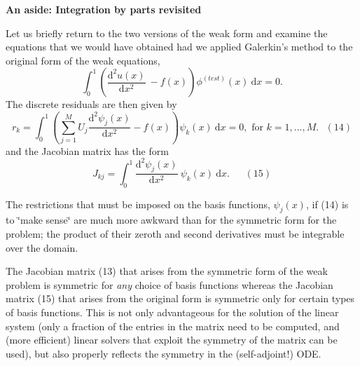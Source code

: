 \begin{TabularC}{1}
\hline
\begin{center}{\bfseries  An aside\-: Integration by parts revisited }\end{center}  Let us briefly return to the two versions of the weak form and examine the equations that we would have obtained had we applied Galerkin's method to the original form of the weak equations, \[ \int_0^1 \left( \frac{\mbox{d}^2 u(x)}{\mbox{d}x^2} \ - f(x) \right) \phi^{(test)}(x) \ \mbox{d}x = 0. \] The discrete residuals are then given by \[ r_k = \int_0^1 \left( \sum_{j=1}^{M} U_{j} \frac{\mbox{d}^2 \psi_j(x)}{\mbox{d} x^2} - f(x) \right) \psi_k(x) \ \mbox{d}x = 0, \mbox{\ \ \ \ \ \ for $k=1,...,M.$\ \ \ \ \ \ } (14) \] and the Jacobian matrix has the form \[ J_{kj} = \int_0^1\frac{\mbox{d}^2 \psi_j(x)}{\mbox{d} x^2} \ \psi_k(x)\ \mbox{d}x. \ \ \ \ \ \ \ (15) \]
\begin{DoxyItemize}
\item The restrictions that must be imposed on the basis functions, $ \psi_j(x) $, if (14) is to \char`\"{}make sense\char`\"{} are much more awkward than for the symmetric form for the problem; the product of their zeroth and second derivatives must be integrable over the domain.
\item The Jacobian matrix (13) that arises from the symmetric form of the weak problem is symmetric for {\itshape any} choice of basis functions whereas the Jacobian matrix (15) that arises from the original form is symmetric only for certain types of basis functions. This is not only advantageous for the solution of the linear system (only a fraction of the entries in the matrix need to be computed, and (more efficient) linear solvers that exploit the symmetry of the matrix can be used), but also properly reflects the symmetry in the (self-\/adjoint!) O\-D\-E.
\end{DoxyItemize}\\
\end{TabularC}




 

